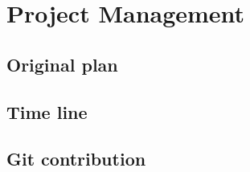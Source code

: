 \section{Project Management}
\subsection{Original plan}
\subsection{Time line}
\subsection{Git contribution}